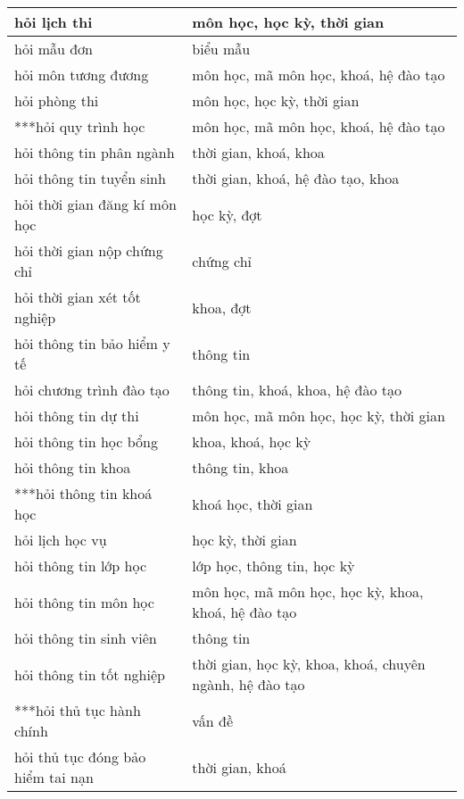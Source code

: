 \begin{table}[htbp]
\begin{tabular}{|l|l|}
        \hline
        hỏi lịch thi & môn học, học kỳ, thời gian \\
        \hline
        hỏi mẫu đơn & biểu mẫu \\
        \hline
        hỏi môn tương đương & môn học, mã môn học, khoá, hệ đào tạo \\
        \hline
        hỏi phòng thi & môn học, học kỳ, thời gian \\
        \hline
        ***hỏi quy trình học & môn học, mã môn học, khoá, hệ đào tạo \\
        \hline
        hỏi thông tin phân ngành & thời gian, khoá, khoa \\
        \hline
        hỏi thông tin tuyển sinh & thời gian, khoá, hệ đào tạo, khoa \\
        \hline
        hỏi thời gian đăng kí môn học & học kỳ, đợt \\
        \hline
        hỏi thời gian nộp chứng chỉ & chứng chỉ \\
        \hline
        hỏi thời gian xét tốt nghiệp & khoa, đợt \\
        \hline
        hỏi thông tin bảo hiểm y tế & thông tin \\
        \hline
        hỏi chương trình đào tạo & thông tin, khoá, khoa, hệ đào tạo \\
        \hline
        hỏi thông tin dự thi & môn học, mã môn học, học kỳ, thời gian \\
        \hline
        hỏi thông tin học bổng & khoa, khoá, học kỳ \\
        \hline
        hỏi thông tin khoa & thông tin, khoa \\
        \hline
        ***hỏi thông tin khoá học & khoá học, thời gian \\
        \hline
        hỏi lịch học vụ & học kỳ, thời gian \\
        \hline
        hỏi thông tin lớp học & lớp học, thông tin, học kỳ \\
        \hline
        hỏi thông tin môn học & môn học, mã môn học, học kỳ, khoa, khoá, hệ đào tạo \\
        \hline
        hỏi thông tin sinh viên & thông tin \\
        \hline
        hỏi thông tin tốt nghiệp & thời gian, học kỳ, khoa, khoá, chuyên ngành, hệ đào tạo \\
        \hline
        ***hỏi thủ tục hành chính & vấn đề \\
        \hline
        hỏi thủ tục đóng bảo hiểm tai nạn & thời gian, khoá \\

\end{tabular}
\end{table}
